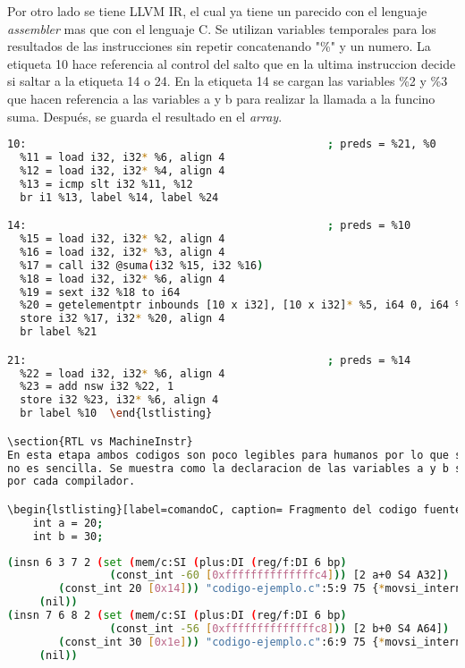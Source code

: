 Por otro lado se tiene LLVM IR, el cual ya tiene un parecido con el lenguaje \emph{assembler} 
mas que con el lenguaje C. Se utilizan variables temporales para los resultados de las 
instrucciones sin repetir concatenando "\%" y un numero. La etiqueta 10 hace referencia 
al control del salto que en la ultima instruccion decide si saltar a la etiqueta 14 o 24. 
En la etiqueta 14 se cargan las variables \%2 y \%3 que hacen referencia a las variables 
a y b para realizar la llamada a la funcino suma. Después, se guarda el resultado en 
el \emph{array}.

\begin{lstlisting}[label=comandoC, caption= Fragmento del LLVM IR de CLANG/LLVM del archivo llvm-ir.ll. \cite{repositorio}, language=bash]
10:                                               ; preds = %21, %0
  %11 = load i32, i32* %6, align 4
  %12 = load i32, i32* %4, align 4
  %13 = icmp slt i32 %11, %12
  br i1 %13, label %14, label %24

14:                                               ; preds = %10
  %15 = load i32, i32* %2, align 4
  %16 = load i32, i32* %3, align 4
  %17 = call i32 @suma(i32 %15, i32 %16)
  %18 = load i32, i32* %6, align 4
  %19 = sext i32 %18 to i64
  %20 = getelementptr inbounds [10 x i32], [10 x i32]* %5, i64 0, i64 %19
  store i32 %17, i32* %20, align 4
  br label %21

21:                                               ; preds = %14
  %22 = load i32, i32* %6, align 4
  %23 = add nsw i32 %22, 1
  store i32 %23, i32* %6, align 4
  br label %10  \end{lstlisting}

\section{RTL vs MachineInstr}
En esta etapa ambos codigos son poco legibles para humanos por lo que su descripción 
no es sencilla. Se muestra como la declaracion de las variables a y b son expresadas 
por cada compilador. 

\begin{lstlisting}[label=comandoC, caption= Fragmento del codigo fuente del archivo codigo-ejemplo.c. \cite{repositorio}, language=bash]
    int a = 20;
    int b = 30; \end{lstlisting}

\begin{lstlisting}[label=comandoC, caption= Fragmento de RTL de GCC del archivo codigo-ejemplo.c.330r.final. \cite{repositorio}, language=bash]
(insn 6 3 7 2 (set (mem/c:SI (plus:DI (reg/f:DI 6 bp)
                (const_int -60 [0xffffffffffffffc4])) [2 a+0 S4 A32])
        (const_int 20 [0x14])) "codigo-ejemplo.c":5:9 75 {*movsi_internal}
     (nil))
(insn 7 6 8 2 (set (mem/c:SI (plus:DI (reg/f:DI 6 bp)
                (const_int -56 [0xffffffffffffffc8])) [2 b+0 S4 A64])
        (const_int 30 [0x1e])) "codigo-ejemplo.c":6:9 75 {*movsi_internal}
     (nil)) \end{lstlisting}

